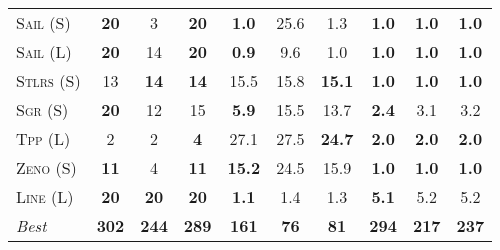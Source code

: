 \documentclass[11pt]{article}
\begin{document}
\begin{table*}[tb]
{\begin{tabular}{|l||ccc||ccc||ccc||}
\textsc{Sail} (S)&\textbf{20}&3&\textbf{20}&\textbf{1.0}&25.6&1.3&\textbf{1.0}&\textbf{1.0}&\textbf{1.0}\\
\textsc{Sail} (L)&\textbf{20}&14&\textbf{20}&\textbf{0.9}&9.6&1.0&\textbf{1.0}&\textbf{1.0}&\textbf{1.0}\\
\textsc{Stlrs} (S)&13&\textbf{14}&\textbf{14}&15.5&15.8&\textbf{15.1}&\textbf{1.0}&\textbf{1.0}&\textbf{1.0}\\
\textsc{Sgr} (S)&\textbf{20}&12&15&\textbf{5.9}&15.5&13.7&\textbf{2.4}&3.1&3.2\\
\textsc{Tpp} (L)&2&2&\textbf{4}&27.1&27.5&\textbf{24.7}&\textbf{2.0}&\textbf{2.0}&\textbf{2.0}\\
\textsc{Zeno} (S)&\textbf{11}&4&\textbf{11}&\textbf{15.2}&24.5&15.9&\textbf{1.0}&\textbf{1.0}&\textbf{1.0}\\
\textsc{Line} (L)&\textbf{20}&\textbf{20}&\textbf{20}&\textbf{1.1}&1.4&1.3&\textbf{5.1}&5.2&5.2
\\\hline
\textit{Best}&\textbf{302}&\textbf{244}&\textbf{289}&\textbf{161}&\textbf{76}&\textbf{81}&\textbf{294}&\textbf{217}&\textbf{237}\\\hline

        \end{tabular}}
        \caption{}
        \label{tab:all-patty}
        \end{table*}
        
\end{document}
